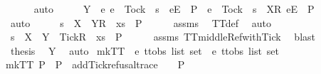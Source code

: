\ \ \ \ \isamarkupfalse%
\ auto\isanewline
\ \ \isamarkupfalse%
\ \isamarkupfalse%
\ {\isachardoublequoteopen}Y\ {\isasyminter}\ {\isacharbraceleft}e{\isachardot}\ {\isacharparenleft}e\ {\isasymnoteq}\ Tock\ {\isasymand}\ s\ {\isacharat}\ {\isacharbrackleft}{\isacharbrackleft}e{\isacharbrackright}\isactrlsub E{\isacharbrackright}\ {\isasymin}\ P{\isacharparenright}\ {\isasymor}\ {\isacharparenleft}e\ {\isacharequal}\ Tock\ {\isasymand}\ s\ {\isacharat}\ {\isacharbrackleft}{\isacharbrackleft}X{\isacharbrackright}\isactrlsub R{\isacharcomma}\ {\isacharbrackleft}e{\isacharbrackright}\isactrlsub E{\isacharbrackright}\ {\isasymin}\ P{\isacharparenright}\ {\isacharbraceright}\ {\isacharequal}\ {\isacharbraceleft}{\isacharbraceright}{\isachardoublequoteclose}\isanewline
\ \ \ \ \isamarkupfalse%
\ auto\isanewline
\ \ \isamarkupfalse%
\ \isamarkupfalse%
\ {\isachardoublequoteopen}s\ {\isacharat}\ {\isacharbrackleft}{\isacharbrackleft}X\ {\isasymunion}\ Y{\isacharbrackright}\isactrlsub R{\isacharbrackright}\ {\isacharat}\ xs\ {\isasymin}\ P{\isachardoublequoteclose}\isanewline
\ \ \ \ \isamarkupfalse%
\ assms\ \isamarkupfalse%
\ TT{}{\isacharunderscore}def\ \isamarkupfalse%
\ auto\isanewline
\ \ \isamarkupfalse%
\ \isamarkupfalse%
\ {\isachardoublequoteopen}s\ {\isacharat}\ {\isacharbrackleft}{\isacharbrackleft}X\ {\isasymunion}\ Y\ {\isasymunion}\ {\isacharbraceleft}Tick{\isacharbraceright}{\isacharbrackright}\isactrlsub R{\isacharbrackright}\ {\isacharat}\ xs\ {\isasymin}\ P{\isachardoublequoteclose}\isanewline
\ \ \ \ \isamarkupfalse%
\ assms\ TT{}{\isacharunderscore}middle{\isacharunderscore}Ref{\isacharunderscore}with{\isacharunderscore}Tick\ \isamarkupfalse%
\ blast\isanewline
\ \ \isamarkupfalse%
\ \isamarkupfalse%
\ {\isacharquery}thesis\ \isamarkupfalse%
\ Y\ \isamarkupfalse%
\ auto\isanewline
{}\isamarkupfalse%
%
\endisatagproof
{\isafoldproof}%
%
\isadelimproof
\isanewline
%
\endisadelimproof
\isanewline
{}\isamarkupfalse%
\ mkTT{}\ {\isacharcolon}{\isacharcolon}\ {\isachardoublequoteopen}{\isacharprime}e\ ttobs\ list\ set\ {\isasymRightarrow}\ {\isacharprime}e\ ttobs\ list\ set{\isachardoublequoteclose}\ \isanewline
{\isachardoublequoteopen}mkTT{}\ P\ {\isacharequal}\ P\ {\isasymunion}\ {\isacharbraceleft}add{\isacharunderscore}Tick{\isacharunderscore}refusal{\isacharunderscore}trace\ {\isasymrho}{\isacharbar}{\isasymrho}{\isachardot}\ {\isasymrho}\ {\isasymin}\ P{\isacharbraceright}{\isachardoublequoteclose}\isanewline
